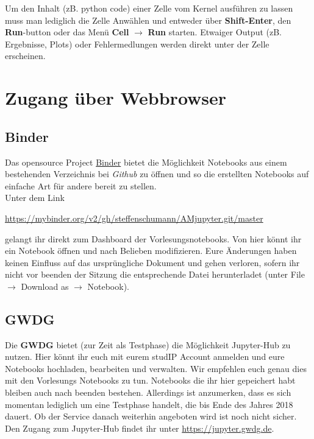 \documentclass[oneside,bibliography=totoc,listof=totoc,BCOR=5mm,DIV=12,colorlinks=true,linkcolor=blue,citecolor=black, urlcolor=blue]{article}
\begin{document}
\noindent Um den Inhalt (zB. python code) einer Zelle vom Kernel ausführen zu lassen muss man lediglich die Zelle Anwählen und entweder über \textbf{Shift-Enter}, den \textbf{Run}-button oder das Menü \textbf{Cell} \(\rightarrow\) \textbf{Run} starten. Etwaiger Output (zB. Ergebnisse, Plots) oder Fehlermedlungen werden direkt unter der Zelle erscheinen.



\section{Zugang über Webbrowser}
\label{sec:org10423f3}

\subsection{Binder}
\label{sec:orgce45b28}
\noindent Das opensource Project \href{https://mybinder.org}{Binder} bietet die Möglichkeit Notebooks aus einem bestehenden Verzeichnis bei \emph{Github} zu öffnen und so die erstellten Notebooks auf einfache Art für andere bereit zu stellen.
\\
\noindent Unter dem Link
\begin{center}\url{https://mybinder.org/v2/gh/steffenschumann/AMjupyter.git/master}\end{center} gelangt ihr direkt zum Dashboard der Vorlesungsnotebooks.
Von hier könnt ihr ein Notebook öffnen und nach Belieben modifizieren. 
Eure Änderungen haben keinen Einfluss auf das ursprüngliche Dokument und gehen verloren, sofern ihr nicht vor beenden der Sitzung die entsprechende Datei herunterladet (unter File \(\rightarrow\) Download as \(\rightarrow\) Notebook).


\subsection{GWDG}
\label{sec:org83601c7}

Die \textbf{GWDG} bietet (zur Zeit als Testphase) die Möglichkeit Jupyter-Hub zu nutzen. Hier könnt ihr euch mit eurem studIP Account anmelden und eure Notebooks hochladen, bearbeiten und verwalten.
\noindent Wir empfehlen euch genau dies mit den Vorlesungs Notebooks zu tun. Notebooks die ihr hier gepeichert habt bleiben auch nach beenden bestehen. Allerdings ist anzumerken, dass es sich momentan lediglich um eine Testphase handelt, die bis Ende des Jahres 2018 dauert. Ob der Service danach weiterhin angeboten wird ist noch nicht sicher.\\
\noindent Den Zugang zum Jupyter-Hub findet ihr unter \url{https://jupyter.gwdg.de}. 
\end{document}
